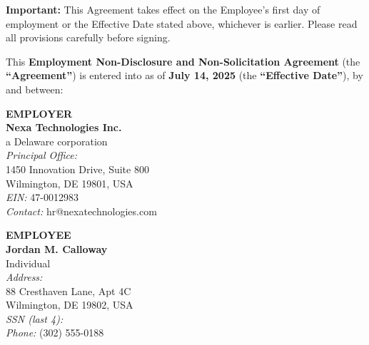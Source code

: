 \documentclass[11pt,a4paper]{article}
\begin{document}
\vspace{8pt}

\begin{tcolorbox}[warningbox]
  \small\color{TextDark}
  \faCalendar\enspace \textbf{Important:} This Agreement takes effect on the Employee's first day
  of employment or the Effective Date stated above, whichever is earlier.
  Please read all provisions carefully before signing.
\end{tcolorbox}

\vspace{12pt}

\noindent
This \textbf{Employment Non-Disclosure and Non-Solicitation Agreement} (the
\textbf{``Agreement''}) is entered into as of \textbf{July 14, 2025} (the
\textbf{``Effective Date''}), by and between:

\vspace{8pt}

\begin{minipage}[t]{0.47\linewidth}
\begin{tcolorbox}[fieldbox]
  \textbf{\color{NavyDeep}EMPLOYER}\\[4pt]
  \textbf{Nexa Technologies Inc.}\\
  a Delaware corporation\\[4pt]
  \textit{Principal Office:}\\
  1450 Innovation Drive, Suite 800\\
  Wilmington, DE 19801, USA\\[4pt]
  \textit{EIN:} 47-0012983\\
  \textit{Contact:} hr@nexatechnologies.com
\end{tcolorbox}
\end{minipage}%
\hfill%
\begin{minipage}[t]{0.47\linewidth}
\begin{tcolorbox}[fieldbox]
  \textbf{\color{NavyDeep}EMPLOYEE}\\[4pt]
  \textbf{Jordan M. Calloway}\\
  Individual\\[4pt]
  \textit{Address:}\\
  88 Cresthaven Lane, Apt 4C\\
  Wilmington, DE 19802, USA\\[4pt]
  \textit{SSN (last 4):} \textendash\textendash\textendash{}\\
  \textit{Phone:} (302) 555-0188
\end{tcolorbox}
\end{minipage}
\end{document}
